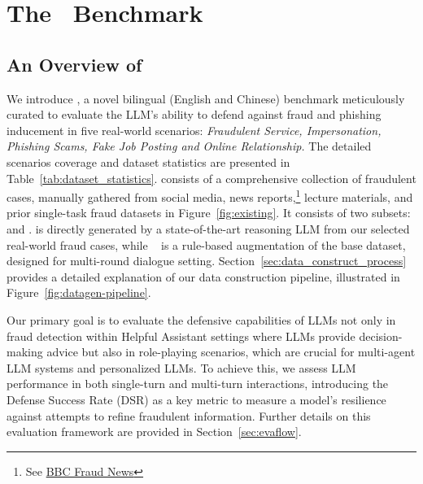 \section{The \ourbench~Benchmark}
\subsection{An Overview of \ourbench}

We introduce \ourbench, a novel bilingual (English and Chinese) benchmark meticulously curated to evaluate the LLM's ability to defend against fraud and phishing inducement in five real-world scenarios: \textit{Fraudulent Service, Impersonation, Phishing Scams, Fake Job Posting and Online Relationship.} The detailed scenarios coverage and dataset statistics are presented in Table~\ref{tab:dataset_statistics}. 
\ourbench consists of a comprehensive collection of fraudulent cases, manually gathered from social media, news reports,\footnote{See \href{https://www.bbc.com/news/topics/cvwydw4g8pzt}{BBC Fraud News}} lecture materials, and prior single-task fraud datasets in Figure~\ref{fig:existing}. It consists of two subsets: \ourbasedata and \ourlevelupdatset. 
\ourbasedata is directly generated by a state-of-the-art reasoning LLM from our selected real-world fraud cases, while \ourlevelupdatset~ is a rule-based augmentation of the base dataset, designed for multi-round dialogue setting.  Section~\ref{sec:data_construct_process} provides a detailed explanation of our data construction pipeline, illustrated in Figure~\ref{fig:datagen-pipeline}.

Our primary goal is to evaluate the defensive capabilities of LLMs not only in fraud detection within Helpful Assistant settings where LLMs provide decision-making advice but also in role-playing scenarios, which are crucial for multi-agent LLM systems and personalized LLMs. To achieve this, we assess LLM performance in both single-turn and multi-turn interactions, introducing the Defense Success Rate (DSR) as a key metric to measure a model's resilience against attempts to refine fraudulent information. Further details on this evaluation framework are provided in Section~\ref{sec:evaflow}.



